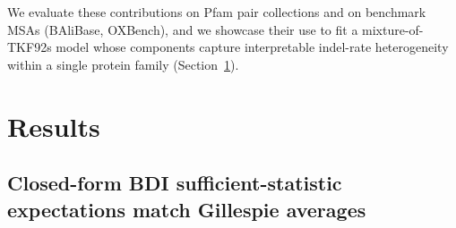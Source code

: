 We evaluate these contributions on Pfam pair collections and on
benchmark MSAs (BAliBase, OXBench), and we showcase their use to
fit a mixture-of-TKF92s model whose components capture interpretable
indel-rate heterogeneity within a single protein family
(Section~\ref{sec:results}).



\section{Results}
\label{sec:results}

\subsection{Closed-form BDI sufficient-statistic expectations match Gillespie averages}
\label{sec:results-bdi-gillespie}


